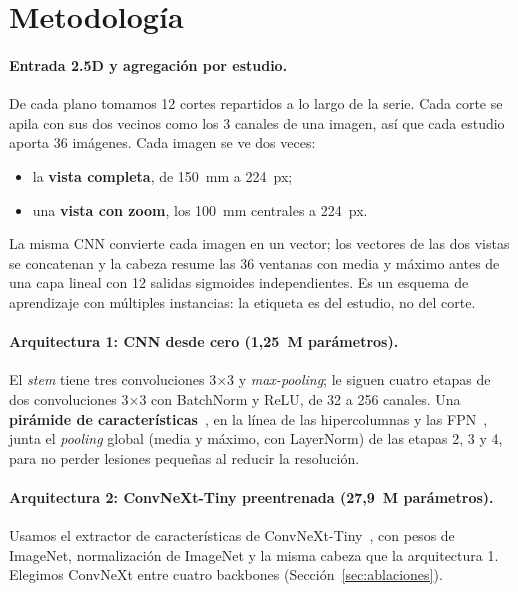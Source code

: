 \documentclass{article}
\begin{document}
\section{Metodología}

\paragraph{Entrada 2.5D y agregación por estudio.} De cada plano tomamos 12 cortes repartidos a lo largo de la serie. Cada corte se apila con sus dos vecinos como los 3 canales de una imagen, así que cada estudio aporta 36 imágenes. Cada imagen se ve dos veces:
\begin{itemize}
  \item la \textbf{vista completa}, de 150~mm a 224~px;
  \item una \textbf{vista con zoom}, los 100~mm centrales a 224~px.
\end{itemize}
La misma CNN convierte cada imagen en un vector; los vectores de las dos vistas se concatenan y la cabeza resume las 36 ventanas con media y máximo antes de una capa lineal con 12 salidas sigmoides independientes. Es un esquema de aprendizaje con múltiples instancias: la etiqueta es del estudio, no del corte.

\paragraph{Arquitectura 1: CNN desde cero (1,25~M parámetros).} El \emph{stem} tiene tres convoluciones 3×3 y \emph{max-pooling}; le siguen cuatro etapas de dos convoluciones 3×3 con BatchNorm y ReLU, de 32 a 256 canales. Una \textbf{pirámide de características}~\cite{dunnhofer2021mrpyrnet}, en la línea de las hipercolumnas y las FPN~\cite{hariharan2015hypercolumns,lin2017fpn}, junta el \emph{pooling} global (media y máximo, con LayerNorm) de las etapas 2, 3 y 4, para no perder lesiones pequeñas al reducir la resolución.

\paragraph{Arquitectura 2: ConvNeXt-Tiny preentrenada (27,9~M parámetros).} Usamos el extractor de características de ConvNeXt-Tiny~\cite{liu2022convnext}, con pesos de ImageNet, normalización de ImageNet y la misma cabeza que la arquitectura 1. Elegimos ConvNeXt entre cuatro backbones (Sección~\ref{sec:ablaciones}).
\end{document}
